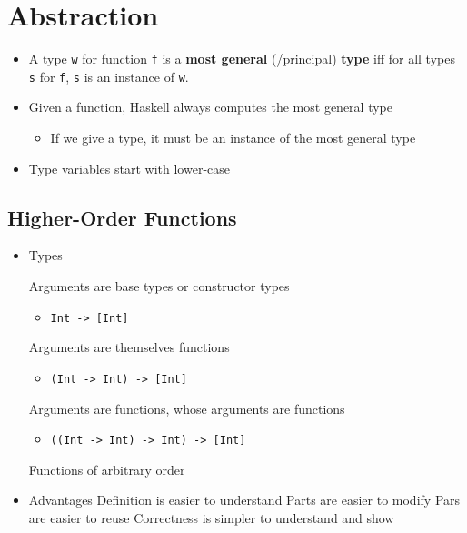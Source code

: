 
\section{Abstraction}
\begin{itemize}
     A set of types
     Function works for type \verb+t+ iff it works for all types contained in \verb+t+
    \item A type \verb+w+ for function \verb+f+ is a \textbf{most general} (/principal) \textbf{type} iff for all types \verb+s+ for \verb+f+, \verb+s+ is an instance of \verb+w+.
    \item Given a function, Haskell always computes the most general type
        \begin{itemize}
            \item If we give a type, it must be an instance of the most general type
        \end{itemize}
    \item Type variables start with lower-case
\end{itemize}

\subsection{Higher-Order Functions}
\begin{itemize}
    \item Types
        \begin{itemize}
             Arguments are base types or constructor types
                \begin{itemize}
                    \item \verb+Int -> [Int]+
                \end{itemize}
             Arguments are themselves functions
                \begin{itemize}
                    \item \verb+(Int -> Int) -> [Int]+
                \end{itemize}
             Arguments are functions, whose arguments are functions
                \begin{itemize}
                    \item \verb+((Int -> Int) -> Int) -> [Int]+
                \end{itemize}
             Functions of arbitrary order
        \end{itemize}
    \item Advantages
    \ipro Definition is easier to understand
    \ipro Parts are easier to modify
    \ipro Pars are easier to reuse
    \ipro Correctness is simpler to understand and show
\end{itemize}

